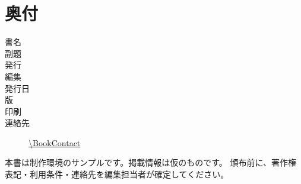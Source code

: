 \chapter{奥付}
\begin{description}
  \item[書名] \BookTitle
  \item[副題] \BookSubtitle
  \item[発行] \CircleName
  \item[編集] \BookEditor
  \item[発行日] \BookDate
  \item[版] \BookEdition
  \item[印刷] \BookPrinter
  \item[連絡先] \url{\BookContact}
\end{description}
\vfill
本書は制作環境のサンプルです。掲載情報は仮のものです。
頒布前に、著作権表記・利用条件・連絡先を編集担当者が確定してください。
